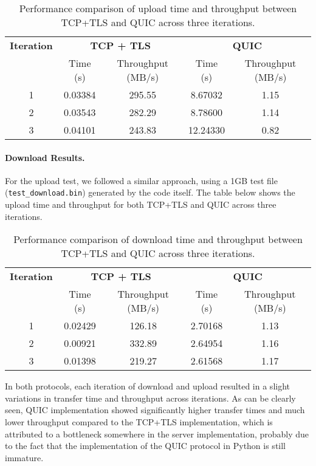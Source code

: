 \begin{table}[!h]
\centering
\begin{tabular}{ccccc}
\toprule
\textbf{Iteration} & \multicolumn{2}{c}{\textbf{TCP + TLS}} & \multicolumn{2}{c}{\textbf{QUIC}} \\
& Time (s) & Throughput (MB/s) & Time (s) & Throughput (MB/s) \\
\midrule
1 & 0.03384 & 295.55 & 8.67032 & 1.15 \\
2 & 0.03543 & 282.29 & 8.78600 & 1.14 \\
3 & 0.04101 & 243.83 & 12.24330 & 0.82 \\
\bottomrule
\end{tabular}
\caption{Performance comparison of upload time and throughput between TCP+TLS and QUIC across three iterations.}
\end{table}

\paragraph{Download Results.} For the upload test, we followed a similar approach, using a 1GB test file (\texttt{test\_download.bin}) generated by the code itself. The table below shows the upload time and throughput for both TCP+TLS and QUIC across three iterations.

\begin{table}[!h]
\centering
\begin{tabular}{ccccc}
\toprule
\textbf{Iteration} & \multicolumn{2}{c}{\textbf{TCP + TLS}} & \multicolumn{2}{c}{\textbf{QUIC}} \\
& Time (s) & Throughput (MB/s) & Time (s) & Throughput (MB/s) \\
\midrule
1 & 0.02429 & 126.18 & 2.70168 & 1.13 \\
2 & 0.00921 & 332.89 & 2.64954 & 1.16 \\
3 & 0.01398 & 219.27 & 2.61568 & 1.17 \\
\bottomrule
\end{tabular}
\caption{Performance comparison of download time and throughput between TCP+TLS and QUIC across three iterations.}
\end{table}

\noindent In both protocols, each iteration of download and upload resulted in a slight variations in transfer time and throughput across iterations. As can be clearly seen, QUIC implementation showed significantly higher transfer times and much lower throughput compared to the TCP+TLS implementation, which is attributed to a bottleneck somewhere in the server implementation, probably due to the fact that the implementation of the QUIC protocol in Python is still immature.

